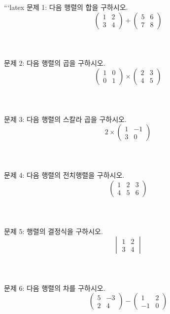 \documentclass[fleqn]{article}
\begin{document}
      
        ```latex
\noindent 문제 1: 다음 행렬의 합을 구하시오.
\[
\begin{pmatrix} 1 & 2 \\ 3 & 4 \end{pmatrix} + \begin{pmatrix} 5 & 6 \\ 7 & 8 \end{pmatrix}
\] 
\\\\\\

\noindent 문제 2: 다음 행렬의 곱을 구하시오.
\[
\begin{pmatrix} 1 & 0 \\ 0 & 1 \end{pmatrix} \times \begin{pmatrix} 2 & 3 \\ 4 & 5 \end{pmatrix}
\]
\\\\\\

\noindent 문제 3: 다음 행렬의 스칼라 곱을 구하시오. 
\[
2 \times \begin{pmatrix} 1 & -1 \\ 3 & 0 \end{pmatrix}
\]
\\\\\\

\noindent 문제 4: 다음 행렬의 전치행렬을 구하시오.
\[
\begin{pmatrix} 1 & 2 & 3 \\ 4 & 5 & 6 \end{pmatrix}
\]
\\\\\\

\noindent 문제 5: 행렬의 결정식을 구하시오.
\[
\begin{vmatrix} 1 & 2 \\ 3 & 4 \end{vmatrix}
\]
\\\\\\

\noindent 문제 6: 다음 행렬의 차를 구하시오.
\[
\begin{pmatrix} 5 & -3 \\ 2 & 4 \end{pmatrix} - \begin{pmatrix} 1 & 2 \\ -1 & 0 \end{pmatrix}
\]
\\\\\\
\end{document}
